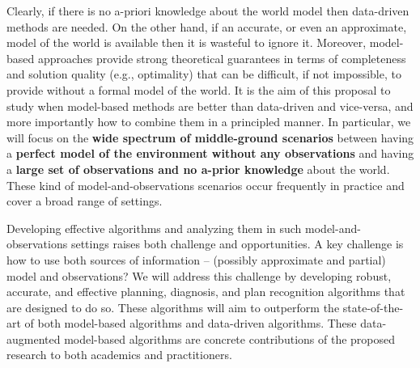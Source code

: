 \documentclass[12pt]{article}
\begin{document}


Clearly, if there is no a-priori knowledge about the world model then data-driven methods are needed. On the other hand, if an accurate, or even an approximate, model of the world is available then it is wasteful to ignore it. %
Moreover, model-based approaches provide strong theoretical guarantees in terms of completeness and solution quality (e.g., optimality) that can be difficult, if not impossible, to provide without a formal model of the world. %
It is the aim of this proposal to study when model-based methods are better than data-driven and vice-versa, and more importantly how to combine them in a principled manner. In particular, we will focus on the {\bf wide spectrum of middle-ground scenarios} between having a {\bf perfect model of the environment without any observations} and having a {\bf large set of observations and no a-prior knowledge} about the world. These kind of model-and-observations scenarios occur frequently in practice and cover a broad range of settings. %



Developing effective algorithms and analyzing them in such model-and-observations settings raises both challenge and opportunities. A key challenge is how to use both sources of information -- (possibly approximate and partial) model and observations? 
We will address this challenge by developing robust, accurate, and effective planning, diagnosis, and plan recognition algorithms that are designed to do so. 
These algorithms will aim to outperform the state-of-the-art of both model-based algorithms and data-driven algorithms. These data-augmented model-based algorithms are concrete contributions of the proposed research to both academics and practitioners. 
\end{document}
